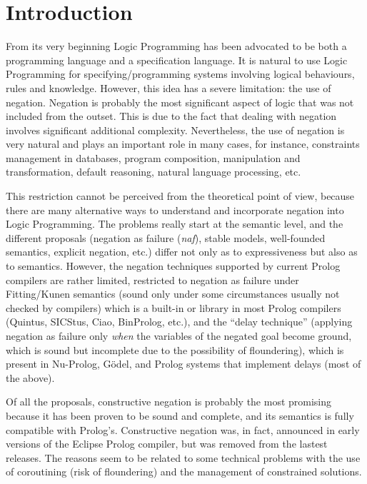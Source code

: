 \documentclass{llncs}
\newcommand{\naf}{{\em naf}}\newcommand{\viejo}[1]{}
\begin{document}

\section{Introduction}
\label{introduction}
From its very beginning Logic Programming has been advocated to be
both a programming language and a specification language. It is
natural to use Logic Programming for specifying/programming systems
involving logical behaviours, rules and knowledge. However, this idea
has a severe limitation: the use of negation. Negation is probably the
most significant aspect of logic that was not included from the
outset. This is due to the fact that dealing with negation involves
significant additional complexity. Nevertheless, the use of negation
is very natural and plays an important role in many cases, for
instance, constraints management in databases, program composition,
manipulation and transformation, default reasoning, natural language
processing, etc.

This restriction cannot be perceived from the theoretical point of
view, because there are many alternative ways to understand and
incorporate negation into Logic Programming. The problems really start
at the semantic level, and the different proposals (negation as
failure (\naf), stable models, well-founded semantics, explicit
negation, etc.)  differ not only as to expressiveness but also as to
semantics.  However, the negation techniques supported by current
Prolog compilers are rather limited, restricted to negation as failure
under Fitting/Kunen semantics \cite{Kunen} (sound only under some
circumstances usually not checked by compilers) which is a built-in or
library in most Prolog compilers (Quintus, SICStus, Ciao, BinProlog,
etc.), and the ``delay technique'' (applying negation as failure only
\emph{when} the variables of the negated goal become ground, which is
sound but incomplete due to the possibility of floundering), which is
present in Nu-Prolog, G\"odel, and Prolog systems that implement
delays (most of the above).

Of all the proposals, constructive negation \cite{Chan1,Chan2} is
probably the most promising because it has been proven to be sound and
complete, and its semantics is fully compatible with
Prolog's. Constructive negation was, in fact, announced in early
versions of the Eclipse Prolog compiler, but was removed from the
lastest releases.  The reasons seem to be related to some technical
problems with the use of coroutining (risk of floundering) and the
management of constrained solutions.
\end{document}
